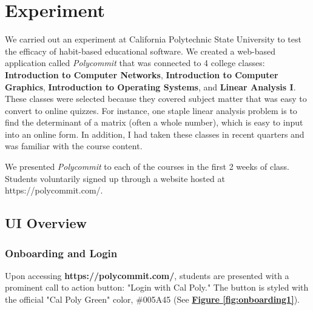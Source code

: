 \chapter{Experiment}

\par We carried out an experiment at California Polytechnic State University to test the efficacy of habit-based educational software. We created a web-based application called \textit{Polycommit} that was connected to 4 college classes: \textbf{Introduction to Computer Networks}, \textbf{Introduction to Computer Graphics}, \textbf{Introduction to Operating Systems}, and \textbf{Linear Analysis I}. These classes were selected because they covered subject matter that was easy to convert to online quizzes. For instance, one staple linear analysis problem is to find the determinant of a matrix (often a whole number), which is easy to input into an online form. In addition, I had taken these classes in recent quarters and was familiar with the course content.

\par We presented \textit{Polycommit} to each of the courses in the first 2 weeks of class. Students voluntarily signed up through a website hosted at https://polycommit.com/.

\section{UI Overview}

\subsection{Onboarding and Login}
\par Upon accessing \textbf{https://polycommit.com/}, students are presented with a prominent call to action button: "Login with Cal Poly." The button is styled with the official "Cal Poly Green" color, \textcolor{CPGreen}{\#005A45} (See \textbf{\hyperref[fig:onboarding1]{Figure \ref*{fig:onboarding1}}}).

